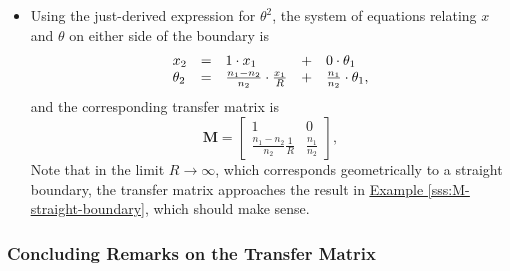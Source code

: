 \documentclass[11pt, a4paper]{article}
\newcommand{\mat}[1]{\mathbf{#1}} %
\begin{document}
\begin{itemize}
    \item Using the just-derived expression for $ \theta^{2} $, the system of equations relating $ x $ and $ \theta $ on either side of the boundary is
    \begin{equation*}
        \begin{array}{l c l c l}
            x_{2} & = & 1 \cdot x_{1} & + & 0 \cdot \theta_{1}\\
            \theta_{2} & = & \frac{n_{1} - n_{2}}{n_{2}} \cdot \frac{x_{1}}{R} & + & \frac{n_{1}}{n_{2}} \cdot \theta_{1},
        \end{array}
    \end{equation*}
    and the corresponding transfer matrix is
    \begin{equation*}
        \mat{M} = 
        \begin{bmatrix}
            1 & 0\\
            \frac{n_{1} - n_{2}}{n_{2}} \frac{1}{R} & \frac{n_{1}}{n_{2}}
        \end{bmatrix},
    \end{equation*}
    Note that in the limit $ R \to \infty $, which corresponds geometrically to a straight boundary, the transfer matrix approaches the result in \hyperref[sss:M-straight-boundary]{\underline{Example \ref{sss:M-straight-boundary}}}, which should make sense.

\end{itemize}

\subsubsection{Concluding Remarks on the Transfer Matrix}
\end{document}
